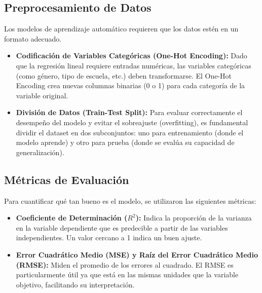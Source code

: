 \documentclass[12pt,letterpaper]{article}
\begin{document}
\subsection{Preprocesamiento de Datos}
Los modelos de aprendizaje automático requieren que los datos estén en un formato adecuado.
\begin{itemize}
    \item \textbf{Codificación de Variables Categóricas (One-Hot Encoding):} Dado que la regresión lineal requiere entradas numéricas, las variables categóricas (como género, tipo de escuela, etc.) deben transformarse. El One-Hot Encoding crea nuevas columnas binarias (0 o 1) para cada categoría de la variable original.
    \item \textbf{División de Datos (Train-Test Split):} Para evaluar correctamente el desempeño del modelo y evitar el sobreajuste (overfitting), es fundamental dividir el dataset en dos subconjuntos: uno para entrenamiento (donde el modelo aprende) y otro para prueba (donde se evalúa su capacidad de generalización).
\end{itemize}

\subsection{Métricas de Evaluación}
Para cuantificar qué tan bueno es el modelo, se utilizaron las siguientes métricas:
\begin{itemize}
    \item \textbf{Coeficiente de Determinación ($R^2$):} Indica la proporción de la varianza en la variable dependiente que es predecible a partir de las variables independientes. Un valor cercano a 1 indica un buen ajuste.
    \item \textbf{Error Cuadrático Medio (MSE) y Raíz del Error Cuadrático Medio (RMSE):} Miden el promedio de los errores al cuadrado. El RMSE es particularmente útil ya que está en las mismas unidades que la variable objetivo, facilitando su interpretación.
\end{itemize}



\end{document}
